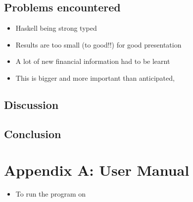 \documentclass{pdfmx4020}
\begin{document}
  \section{Problems encountered} %
  \label{sec:problems_encountered}
    \begin{itemize}
      \item Haskell being strong typed
      \item Results are too small (to good!!) for good presentation
      \item A lot of new financial information had to be learnt
      \item This is bigger and more important than anticipated, 
    \end{itemize}
  

  \section{Discussion} %
  \label{sec:discussion}
  

  \section{Conclusion} %
  \label{sec:conclusion}
  




\chapter*{Appendix A: User Manual}

\begin{itemize}
  \item To run the program on 
\end{itemize}
\end{document}
